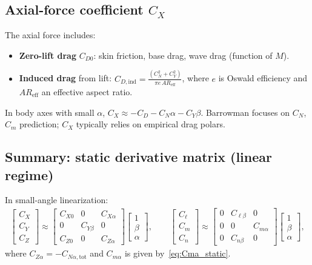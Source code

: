 \documentclass[11pt]{article}
\begin{document}
\subsection{Axial-force coefficient $C_X$}
The axial force includes:
\begin{itemize}[leftmargin=2em]
\item \textbf{Zero-lift drag} $C_{D0}$: skin friction, base drag, wave drag (function of $M$).
\item \textbf{Induced drag} from lift: $C_{D,\text{ind}} = \frac{(C_N^2+C_Y^2)}{\pi e\, AR_{\text{eff}}}$, where $e$ is Oswald efficiency and $AR_{\text{eff}}$ an effective aspect ratio.
\end{itemize}
In body axes with small $\alpha$, $C_X \approx -C_D - C_N\alpha - C_Y\beta$. Barrowman focuses on $C_N$, $C_m$ prediction; $C_X$ typically relies on empirical drag polars.

\subsection{Summary: static derivative matrix (linear regime)}
In small-angle linearization:
\begin{align}
\begin{bmatrix}C_X\\C_Y\\C_Z\end{bmatrix}
\approx
\begin{bmatrix}
C_{X0} & 0 & C_{X\alpha}\\
0 & C_{Y\beta} & 0\\
C_{Z0} & 0 & C_{Z\alpha}
\end{bmatrix}
\begin{bmatrix}1\\\beta\\\alpha\end{bmatrix},
\qquad
\begin{bmatrix}C_\ell\\C_m\\C_n\end{bmatrix}
\approx
\begin{bmatrix}
0 & C_{\ell\beta} & 0\\
0 & 0 & C_{m\alpha}\\
0 & C_{n\beta} & 0
\end{bmatrix}
\begin{bmatrix}1\\\beta\\\alpha\end{bmatrix},
\end{align}
where $C_{Z\alpha}=-C_{N\alpha,\text{tot}}$ and $C_{m\alpha}$ is given by~\eqref{eq:Cma_static}.
\end{document}
